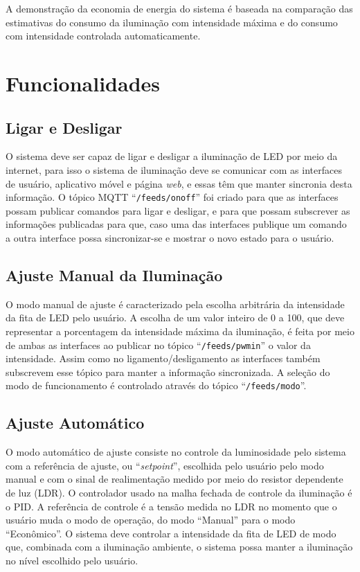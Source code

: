 A demonstração da economia de energia do sistema é baseada na comparação das estimativas do consumo da iluminação com intensidade máxima e do consumo com intensidade controlada automaticamente.

\section{Funcionalidades}

\subsection{Ligar e Desligar}

O sistema deve ser capaz de ligar e desligar a iluminação de LED por meio da internet, para isso o sistema de iluminação deve se comunicar com as interfaces de usuário, aplicativo móvel e página \textit{web}, e essas têm que manter sincronia desta informação. O tópico MQTT ``\texttt{/feeds/onoff}'' foi criado para que as interfaces possam publicar comandos para ligar e desligar, e para que possam subscrever as informações publicadas para que, caso uma das interfaces publique um comando a outra interface possa sincronizar-se e mostrar o novo estado para o usuário.

\subsection{Ajuste Manual da Iluminação}

O modo manual de ajuste é caracterizado pela escolha arbitrária da intensidade da fita de LED pelo usuário. A escolha de um valor inteiro de 0 a 100, que deve representar a porcentagem da intensidade máxima da iluminação, é feita por meio de ambas as interfaces ao publicar no tópico ``\texttt{/feeds/pwmin}'' o valor da intensidade. Assim como no ligamento/desligamento as interfaces também subscrevem esse tópico para manter a informação sincronizada. A seleção do modo de funcionamento é controlado através do tópico ``\texttt{/feeds/modo}''.

\subsection{Ajuste Automático}

O modo automático de ajuste consiste no controle da luminosidade pelo sistema com a referência de ajuste, ou ``\textit{setpoint}'', escolhida pelo usuário pelo modo manual e com o sinal de realimentação medido por meio do  resistor dependente de luz (LDR). O controlador usado na malha fechada de controle da iluminação é o \acf{PID}. A referência de controle é a tensão medida no LDR no momento que o usuário muda o modo de operação, do modo ``Manual'' para o modo ``Econômico''. O sistema deve controlar a intensidade da fita de LED de modo que, combinada com a iluminação ambiente, o sistema possa manter a iluminação no nível escolhido pelo usuário.


